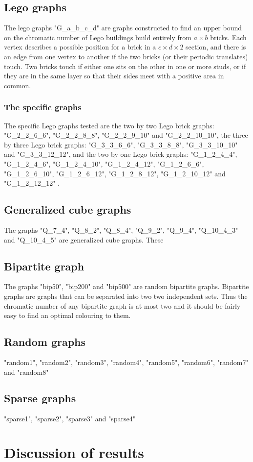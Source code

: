 \subsection{Lego graphs}
The lego graphs "G\_a\_b\_c\_d" are graphs constructed to find an upper bound on the chromatic number of Lego buildings build entirely from $a\times b$ bricks. Each vertex describes a possible position for a brick in a $c\times d \times 2$ section, and there is an edge from one vertex to another if the two bricks (or their periodic translates) touch. Two bricks touch if either one sits on the other in one or more studs, or if they are in the same layer so that their sides meet with a positive area in common.\\
\subsubsection{The specific graphs}
The specific Lego graphs tested are the two by two Lego brick graphs: "G\_2\_2\_6\_6", "G\_2\_2\_8\_8", "G\_2\_2\_9\_10" and "G\_2\_2\_10\_10",
the three by three Lego brick graphs: "G\_3\_3\_6\_6", "G\_3\_3\_8\_8", "G\_3\_3\_10\_10" and "G\_3\_3\_12\_12",
and the two by one Lego brick graphs: "G\_1\_2\_4\_4", "G\_1\_2\_4\_6", "G\_1\_2\_4\_10", "G\_1\_2\_4\_12", "G\_1\_2\_6\_6", "G\_1\_2\_6\_10", "G\_1\_2\_6\_12", "G\_1\_2\_8\_12", "G\_1\_2\_10\_12" and "G\_1\_2\_12\_12" .
\subsection{Generalized cube graphs}
The graphs "Q\_7\_4", "Q\_8\_2", "Q\_8\_4", "Q\_9\_2", "Q\_9\_4", "Q\_10\_4\_3" and "Q\_10\_4\_5" are generalized cube graphs. These 
\subsection{Bipartite graph}  
The graphs "bip50", "bip200" and "bip500" are random bipartite graphs. Bipartite graphs are graphs that can be separated into two two independent sets. Thus the chromatic number of any bipartite graph is at most two and it should be fairly easy to find an optimal colouring to them.
\subsection{Random graphs}
"random1", "random2", "random3", "random4", "random5", "random6", "random7" and "random8"
\subsection{Sparse graphs}
"sparse1", "sparse2", "sparse3" and "sparse4"
\newpage

\section{Discussion of results}
